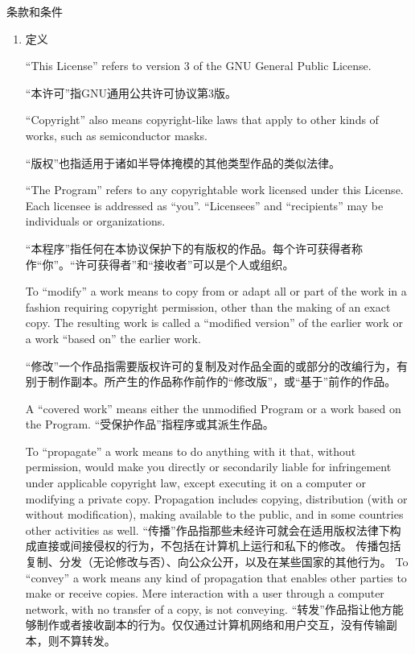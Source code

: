 \documentclass[11pt]{article}
\begin{document}
\begin{center}
  {\Large \sc 条款和条件}
\end{center}


\begin{enumerate}

  \addtocounter{enumi}{-1}

  \item 定义

        ``This License'' refers to version 3 of the GNU General Public License.

        “本许可”指GNU通用公共许可协议第3版。

        ``Copyright'' also means copyright-like laws that apply to other kinds of
        works, such as semiconductor masks.

        “版权”也指适用于诸如半导体掩模的其他类型作品的类似法律。

        ``The Program'' refers to any copyrightable work licensed under this
        License.  Each licensee is addressed as ``you''.  ``Licensees'' and
        ``recipients'' may be individuals or organizations.

        “本程序”指任何在本协议保护下的有版权的作品。每个许可获得者称作“你”。“许可获得者”和“接收者”可以是个人或组织。

        To ``modify'' a work means to copy from or adapt all or part of the work
        in a fashion requiring copyright permission, other than the making of an
        exact copy.  The resulting work is called a ``modified version'' of the
        earlier work or a work ``based on'' the earlier work.

        “修改”一个作品指需要版权许可的复制及对作品全面的或部分的改编行为，有别于制作副本。所产生的作品称作前作的“修改版”，或“基于”前作的作品。

        A ``covered work'' means either the unmodified Program or a work based
        on the Program.
        “受保护作品”指程序或其派生作品。

        To ``propagate'' a work means to do anything with it that, without
        permission, would make you directly or secondarily liable for
        infringement under applicable copyright law, except executing it on a
        computer or modifying a private copy.  Propagation includes copying,
        distribution (with or without modification), making available to the
        public, and in some countries other activities as well.
        “传播”作品指那些未经许可就会在适用版权法律下构成直接或间接侵权的行为，不包括在计算机上运行和私下的修改。
        传播包括复制、分发（无论修改与否）、向公众公开，以及在某些国家的其他行为。
        To ``convey'' a work means any kind of propagation that enables other
        parties to make or receive copies.  Mere interaction with a user through
        a computer network, with no transfer of a copy, is not conveying.
        “转发”作品指让他方能够制作或者接收副本的行为。仅仅通过计算机网络和用户交互，没有传输副本，则不算转发。


\end{enumerate}
\end{document}
